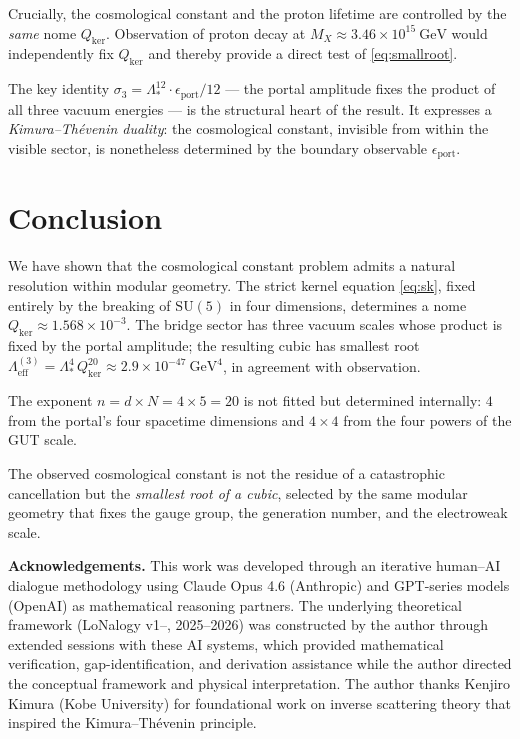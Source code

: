\documentclass[12pt]{article}
\begin{document}
Crucially, the cosmological constant and the proton lifetime are controlled
by the \emph{same} nome $Q_{\mathrm{ker}}$.
Observation of proton decay at $M_X\approx3.46\times10^{15}~\mathrm{GeV}$
would independently fix $Q_{\mathrm{ker}}$ and thereby provide a
direct test of \eqref{eq:smallroot}.

The key identity $\sigma_3=\Lambda_*^{12}\cdot\epsilon_{\mathrm{port}}/12$
--- the portal amplitude fixes the product of all three vacuum energies ---
is the structural heart of the result.
It expresses a \emph{Kimura--Th\'evenin duality}: the cosmological
constant, invisible from within the visible sector, is nonetheless
determined by the boundary observable $\epsilon_{\mathrm{port}}$.

\section{Conclusion}

We have shown that the cosmological constant problem admits a
natural resolution within modular geometry.
The strict kernel equation \eqref{eq:sk}, fixed entirely by the
breaking of $\mathrm{SU}(5)$ in four dimensions, determines a nome
$Q_{\mathrm{ker}}\approx1.568\times10^{-3}$.
The bridge sector has three vacuum scales whose product is fixed by
the portal amplitude; the resulting cubic has smallest root
$\Lambda_{\mathrm{eff}}^{(3)}=\Lambda_*^4\,Q_{\mathrm{ker}}^{20}
\approx2.9\times10^{-47}~\mathrm{GeV}^4$,
in agreement with observation.

The exponent $n=d\times N=4\times5=20$ is not fitted
but determined internally: $4$ from the portal's four spacetime
dimensions and $4\times4$ from the four powers of the GUT scale.

The observed cosmological constant is not the residue of a catastrophic
cancellation but the \emph{smallest root of a cubic},
selected by the same modular geometry that fixes the gauge group,
the generation number, and the electroweak scale.

\vspace{1cm}
\noindent\textbf{Acknowledgements.}
This work was developed through an iterative human--AI dialogue
methodology using Claude Opus 4.6 (Anthropic) and GPT-series models
(OpenAI) as mathematical reasoning partners.
The underlying theoretical framework (LoNalogy v1--, 2025--2026)
was constructed by the author through extended sessions with these
AI systems, which provided mathematical verification, gap-identification,
and derivation assistance while the author directed the conceptual
framework and physical interpretation.
The author thanks Kenjiro Kimura (Kobe University) for foundational
work on inverse scattering theory that inspired the
Kimura--Th\'evenin principle.
\end{document}

